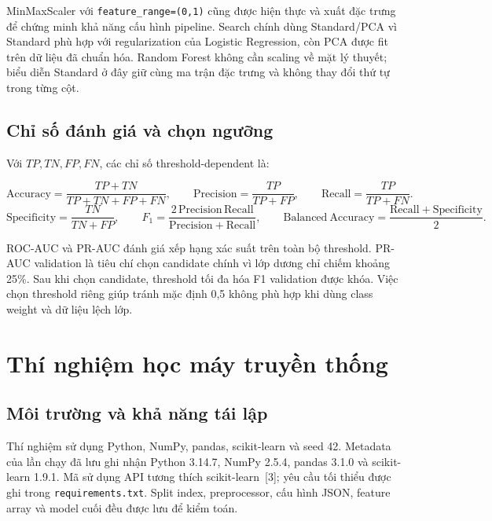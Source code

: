 \documentclass[12pt,a4paper,oneside]{report}
\newcommand{\code}[1]{\texttt{#1}}
\begin{document}
MinMaxScaler với \code{feature\_range=(0,1)} cũng được hiện thực và xuất đặc trưng để chứng minh khả năng cấu hình pipeline. Search chính dùng Standard/PCA vì Standard phù hợp với regularization của Logistic Regression, còn PCA được fit trên dữ liệu đã chuẩn hóa. Random Forest không cần scaling về mặt lý thuyết; biểu diễn Standard ở đây giữ cùng ma trận đặc trưng và không thay đổi thứ tự trong từng cột.

\section{Chỉ số đánh giá và chọn ngưỡng}

Với $TP,TN,FP,FN$, các chỉ số threshold-dependent là:

\[
  \mathrm{Accuracy}=\frac{TP+TN}{TP+TN+FP+FN},\qquad
  \mathrm{Precision}=\frac{TP}{TP+FP},\qquad
  \mathrm{Recall}=\frac{TP}{TP+FN}.
\]
\[
  \mathrm{Specificity}=\frac{TN}{TN+FP},\qquad
  F_1=\frac{2\,\mathrm{Precision}\,\mathrm{Recall}}
  {\mathrm{Precision}+\mathrm{Recall}},\qquad
  \mathrm{Balanced\ Accuracy}=\frac{\mathrm{Recall}+\mathrm{Specificity}}{2}.
\]

ROC-AUC và PR-AUC đánh giá xếp hạng xác suất trên toàn bộ threshold. PR-AUC validation là tiêu chí chọn candidate chính vì lớp dương chỉ chiếm khoảng 25\%. Sau khi chọn candidate, threshold tối đa hóa F1 validation được khóa. Việc chọn threshold riêng giúp tránh mặc định 0,5 không phù hợp khi dùng class weight và dữ liệu lệch lớp.

\chapter{Thí nghiệm học máy truyền thống}

\section{Môi trường và khả năng tái lập}

Thí nghiệm sử dụng Python, NumPy, pandas, scikit-learn và seed 42. Metadata của lần chạy đã lưu ghi nhận Python 3.14.7, NumPy 2.5.4, pandas 3.1.0 và scikit-learn 1.9.1. Mã sử dụng API tương thích scikit-learn~[3]; yêu cầu tối thiểu được ghi trong \code{requirements.txt}. Split index, preprocessor, cấu hình JSON, feature array và model cuối đều được lưu để kiểm toán.
\end{document}
